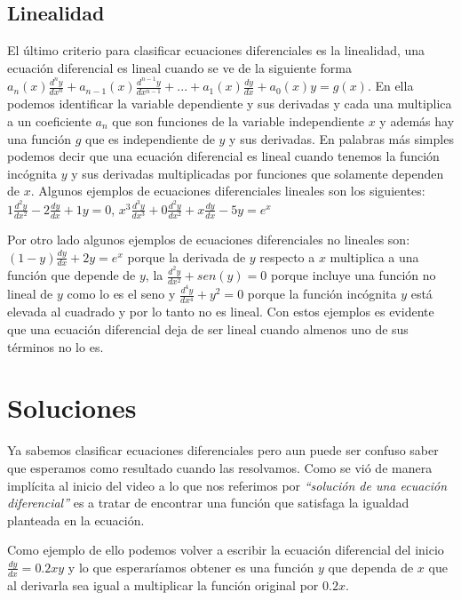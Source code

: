 \documentclass[12pt, letterpaper]{article}
\begin{document}
        \subsection{Linealidad}
            \noindent
                El último criterio para clasificar ecuaciones diferenciales es la linealidad, una ecuación diferencial es lineal cuando se ve de la siguiente forma $a_n(x)\frac{d^ny}{dx^n}+a_{n-1}(x)\frac{d^{n-1}y}{dx^{n-1}}+...+a_1(x)\frac{dy}{dx}+a_0(x)y=g(x)$. En ella podemos identificar la variable dependiente y sus derivadas y cada una multiplica a un coeficiente $a_n$ que son funciones de la variable independiente $x$ y además hay una función $g$ que es independiente de $y$ y sus derivadas.
                En palabras más simples podemos decir que una ecuación diferencial es lineal cuando tenemos la función incógnita $y$ y sus derivadas multiplicadas por funciones que solamente dependen de $x$. Algunos ejemplos de ecuaciones diferenciales lineales son los siguientes: $1\frac{d^2y}{dx^2}-2\frac{dy}{dx}+1y=0$, $x^3\frac{d^3y}{dx^3}+0\frac{d^2y}{dx^2}+x\frac{dy}{dx}-5y=e^x$
            \par
                Por otro lado algunos ejemplos de ecuaciones diferenciales no lineales son: $(1-y)\frac{dy}{dx}+2y=e^x$ porque la derivada de $y$ respecto a $x$ multiplica a una función que depende de $y$, la $\frac{d^2y}{dx^2}+sen(y)=0$ porque incluye una función no lineal de $y$ como lo es el seno y $\frac{d^4y}{dx^4}+y^2=0$ porque la función incógnita $y$ está elevada al cuadrado y por lo tanto no es lineal.
                Con estos ejemplos es evidente que una ecuación diferencial deja de ser lineal cuando almenos uno de sus términos no lo es.
        
    \section{Soluciones}
        \noindent
            Ya sabemos clasificar ecuaciones diferenciales pero aun puede ser confuso saber que esperamos como resultado cuando las resolvamos.
            Como se vió de manera implícita al inicio del video a lo que nos referimos por \emph{``solución de una ecuación diferencial''} es a tratar de encontrar una función que satisfaga la igualdad planteada en la ecuación.
        \par 
            Como ejemplo de ello podemos volver a escribir la ecuación diferencial del inicio $\frac{dy}{dx} = 0.2xy$ y lo que esperaríamos obtener es una función $y$ que dependa de $x$ que al derivarla sea igual a multiplicar la función original por $0.2x$. 
\end{document}
